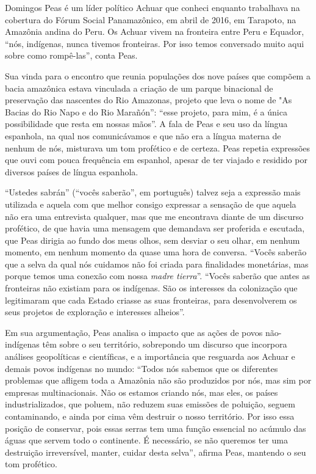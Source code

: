 Domingos Peas é um líder político Achuar que conheci enquanto trabalhava
na cobertura do Fórum Social Panamazônico, em abril de 2016, em
Tarapoto, na Amazônia andina do Peru. Os Achuar vivem na fronteira entre
Peru e Equador, ``nós, indígenas, nunca tivemos fronteiras. Por isso
temos conversado muito aqui sobre como rompê-las'', conta Peas.

Sua vinda para o encontro que reunia populações dos nove países que
compõem a bacia amazônica estava vinculada a criação de um parque
binacional de preservação das nascentes do Rio Amazonas, projeto que
leva o nome de "As Bacias do Rio Napo e do Rio Marañón'': ``esse
projeto, para mim, é a única possibilidade que resta em nossas mãos''. A
fala de Peas e seu uso da língua espanhola, na qual nos comunicávamos e
que não era a língua materna de nenhum de nós, misturava um tom
profético e de certeza. Peas repetia expressões que ouvi com pouca
frequência em espanhol, apesar de ter viajado e residido por diversos
países de língua espanhola.

``Ustedes sabrán'' (``vocês saberão'', em português) talvez seja a
expressão mais utilizada e aquela com que melhor consigo expressar a
sensação de que aquela não era uma entrevista qualquer, mas que me
encontrava diante de um discurso profético, de que havia uma mensagem
que demandava ser proferida e escutada, que Peas dirigia ao fundo dos
meus olhos, sem desviar o seu olhar, em nenhum momento, em nenhum
momento da quase uma hora de conversa. ``Vocês saberão que a selva da
qual nós cuidamos não foi criada para finalidades monetárias, mas porque
temos uma conexão com nossa \emph{madre tierra}''. ``Vocês saberão que
antes as fronteiras não existiam para os indígenas. São os interesses da
colonização que legitimaram que cada Estado criasse as suas fronteiras,
para desenvolverem os seus projetos de exploração e interesses
alheios''.

Em sua argumentação, Peas analisa o impacto que as ações de povos
não-indígenas têm sobre o seu território, sobrepondo um discurso que
incorpora análises geopolíticas e científicas, e a importância que
resguarda aos Achuar e demais povos indígenas no mundo: ``Todos nós
sabemos que os diferentes problemas que afligem toda a Amazônia não são
produzidos por nós, mas sim por empresas multinacionais. Não os estamos
criando nós, mas eles, os países industrializados, que poluem, não
reduzem suas emissões de poluição, seguem contaminando, e ainda por cima
vêm destruir o nosso território. Por isso essa posição de conservar,
pois essas serras tem uma função essencial no acúmulo das águas que
servem todo o continente. É necessário, se não queremos ter uma
destruição irreversível, manter, cuidar desta selva'', afirma Peas,
mantendo o seu tom profético.

